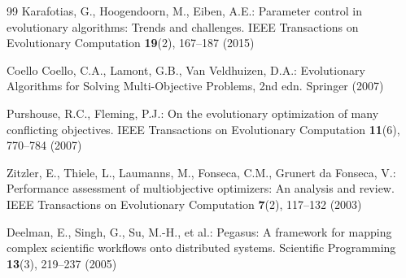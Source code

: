 \documentclass[runningheads]{llncs}
\begin{document}
\begin{thebibliography}{99}
Karafotias, G., Hoogendoorn, M., Eiben, A.E.: Parameter control in evolutionary algorithms: Trends and challenges. IEEE Transactions on Evolutionary Computation \textbf{19}(2), 167--187 (2015)

Coello Coello, C.A., Lamont, G.B., Van Veldhuizen, D.A.: Evolutionary Algorithms for Solving Multi-Objective Problems, 2nd edn. Springer (2007)

Purshouse, R.C., Fleming, P.J.: On the evolutionary optimization of many conflicting objectives. IEEE Transactions on Evolutionary Computation \textbf{11}(6), 770--784 (2007)

Zitzler, E., Thiele, L., Laumanns, M., Fonseca, C.M., Grunert da Fonseca, V.: Performance assessment of multiobjective optimizers: An analysis and review. IEEE Transactions on Evolutionary Computation \textbf{7}(2), 117--132 (2003)

Deelman, E., Singh, G., Su, M.-H., et al.: Pegasus: A framework for mapping complex scientific workflows onto distributed systems. Scientific Programming \textbf{13}(3), 219--237 (2005)


\end{thebibliography}
\end{document}
